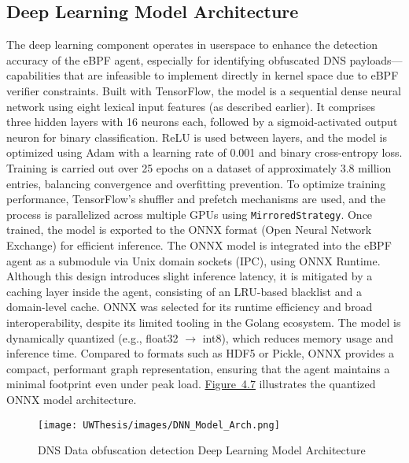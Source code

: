 \documentclass [11pt, proquest] {uwthesis}[2020/02/24]
\begin{document}
\subsection{Deep Learning Model Architecture}
\label{sec:model}
The deep learning component operates in userspace to enhance the detection accuracy of the eBPF agent, especially for identifying obfuscated DNS payloads—capabilities that are infeasible to implement directly in kernel space due to eBPF verifier constraints.
Built with TensorFlow, the model is a sequential dense neural network using eight lexical input features (as described earlier). It comprises three hidden layers with 16 neurons each, followed by a sigmoid-activated output neuron for binary classification. ReLU is used between layers, and the model is optimized using Adam with a learning rate of 0.001 and binary cross-entropy loss. Training is carried out over 25 epochs on a dataset of approximately 3.8 million entries, balancing convergence and overfitting prevention.
To optimize training performance, TensorFlow’s shuffler and prefetch mechanisms are used, and the process is parallelized across multiple GPUs using \texttt{MirroredStrategy}. Once trained, the model is exported to the ONNX format (Open Neural Network Exchange) for efficient inference. The ONNX model is integrated into the eBPF agent as a submodule via Unix domain sockets (IPC), using ONNX Runtime. Although this design introduces slight inference latency, it is mitigated by a caching layer inside the agent, consisting of an LRU-based blacklist and a domain-level cache. ONNX was selected for its runtime efficiency and broad interoperability, despite its limited tooling in the Golang ecosystem. The model is dynamically quantized (e.g., float32 $\rightarrow$ int8), which reduces memory usage and inference time. Compared to formats such as HDF5 or Pickle, ONNX provides a compact, performant graph representation, ensuring that the agent maintains a minimal footprint even under peak load. \hyperref[sec:model_arch]{Figure~4.7} illustrates the quantized ONNX model architecture.




\begin{figure}[htbp]
\texttt{[image: UWThesis/images/DNN\_Model\_Arch.png]}
\caption{DNS Data obfuscation detection Deep Learning Model Architecture}
\label{sec:model_arch}
\end{figure}
\end{document}
